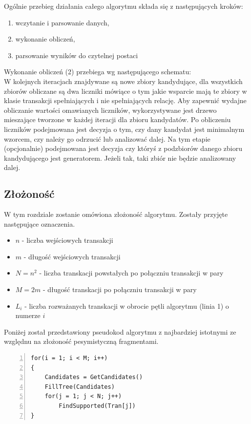 \documentclass[a4paper,12pt]{article}
\begin{document}
Ogólnie przebieg działania całego algorytmu składa się z następujących kroków:

\begin{enumerate}
\item wczytanie i parsowanie danych,
\item wykonanie obliczeń,
\item parsowanie wyników do czytelnej postaci
\end{enumerate}

Wykonanie obliczeń (2) przebiega wg następującego schematu:\\

W kolejnych iteracjach znajdywane są nowe zbiory kandydujące, dla wszystkich zbiorów obliczane są dwa liczniki mówiące o tym jakie wsparcie mają te zbiory w klasie transakcji spełniających i nie spełniających relację. Aby zapewnić wydajne obliczanie wartości omawianych liczników, wykorzystywane jest drzewo mieszające tworzone w każdej iteracji dla zbioru kandydatów. Po obliczeniu liczników podejmowana jest decyzja o tym, czy dany kandydat
jest minimalnym wzorcem, czy należy go odrzucić lub analizować dalej. Na tym etapie (opcjonalnie) podejmowana jest decyzja czy któryś z podzbiorów danego zbioru kandydującego jest generatorem. Jeżeli tak, taki zbiór nie będzie analizowany dalej.

\subsection{Złożoność}
W tym rozdziale zostanie omówiona złożoność algorytmu. Zostały przyjęte następujące oznaczenia.
\begin{itemize}
\item $ n$ - liczba wejściowych transakcji
\item $ m$ - długość wejściowych transakcji
\item $ N = n^2$ - liczba transkacji powstałych po połączniu transakcji w pary
\item $ M = 2m$ - długość transkacji po połączniu transakcji w pary
\item $ L_i$ - liczba rozważanych transkacji w obrocie pętli algorytmu (linia 1) o numerze $i$
\end{itemize}
Poniżej został przedstawiony pseudokod algorytmu z najbardziej istotnymi ze względnu na złożoność pesymistyczną fragmentami.
\begin{lstlisting}[numbers=left]
for(i = 1; i < M; i++)
{
	Candidates = GetCandidates()
	FillTree(Candidates)
	for(j = 1; j < N; j++)
		FindSupported(Tran[j])
}
\end{lstlisting}
\end{document}
